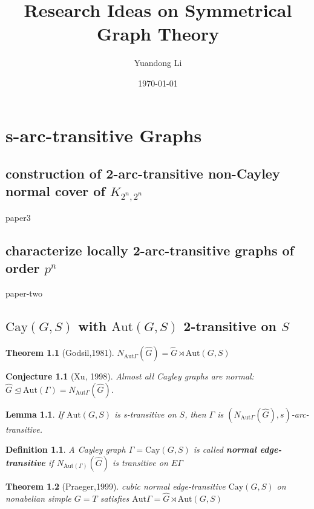 \documentclass[a4paper,11pt,openany]{book}
\title{Research Ideas on Symmetrical Graph Theory}
\author{Yuandong Li}
\date{\today}
\newtheorem{theorem}{Theorem}[section]
\newtheorem{lemma}{Lemma}[theorem]
\newtheorem{conjecture}{Conjecture}[section]
\newtheorem{definition}{Definition}
\def\Aut{\mathrm{Aut}}
\def\Cay{\mathrm{Cay}}
\begin{document}
\maketitle

\tableofcontents


\chapter{s-arc-transitive Graphs}
\section{construction of 2-arc-transitive non-Cayley normal cover of $K_{2^n,2^n}$}
paper3


\section{characterize locally 2-arc-transitive graphs of order $p^n$}
paper-two



\section{$\Cay(G,S)$ with $\Aut(G,S)$ 2-transitive on $S$}

\begin{theorem}[Godsil,1981]
	$N_{\Aut\Gamma}(\hat{G})=\hat{G}\rtimes \Aut(G,S)$
\end{theorem}

\begin{conjecture}[Xu, 1998]
	Almost all Cayley graphs are normal: $\hat{G}\trianglelefteq\Aut(\Gamma)=N_{\Aut\Gamma}(\hat{G})$.
\end{conjecture}


\begin{lemma}
	If $\Aut(G,S)$ is s-transitive on $S$, then $\Gamma$ is $(N_{\Aut\Gamma}(\hat{G}),s)$-arc-transitive.
\end{lemma}

\begin{definition}
	A Cayley graph $\Gamma=\Cay(G,S)$ is called \textbf{normal edge-transitive} if $N_{\Aut(\Gamma)}(\hat{G})$ is transitive on $E\Gamma$
\end{definition}

\begin{theorem}[Praeger,1999]
	cubic normal edge-transitive $\Cay(G,S)$ on nonabelian simple $G=T$ satisfies $\Aut\Gamma=\hat{G}\rtimes \Aut(G,S)$
\end{theorem}
\end{document}
